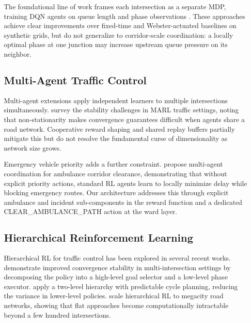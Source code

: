 \documentclass[conference]{IEEEtran}
\begin{document}
The foundational line of work frames each intersection as a separate MDP,
training DQN agents on queue length and phase observations
\cite{acm2021drl, shalaby2021intelligent}. These approaches achieve clear
improvements over fixed-time and Webster-actuated baselines on synthetic
grids, but do not generalize to corridor-scale coordination: a locally
optimal phase at one junction may increase upstream queue pressure on its
neighbor.

\subsection{Multi-Agent Traffic Control}

Multi-agent extensions apply independent learners to multiple intersections
simultaneously. \citeauthor{marl2025sciencedirect} \cite{marl2025sciencedirect}
survey the stability challenges in MARL traffic settings, noting that
non-stationarity makes convergence guarantees difficult when agents share
a road network. Cooperative reward shaping and shared replay buffers partially
mitigate this but do not resolve the fundamental curse of dimensionality
as network size grows.

Emergency vehicle priority adds a further constraint. \citeauthor{multiagent2022emergency}
\cite{multiagent2022emergency} propose multi-agent coordination for ambulance
corridor clearance, demonstrating that without explicit priority actions,
standard RL agents learn to locally minimize delay while blocking emergency
routes. Our architecture addresses this through explicit ambulance and incident
sub-components in the reward function and a dedicated CLEAR\_AMBULANCE\_PATH
action at the ward layer.

\subsection{Hierarchical Reinforcement Learning}

Hierarchical RL for traffic control has been explored in several recent
works. \citeauthor{hier2024naturereports} \cite{hier2024naturereports}
demonstrate improved convergence stability in multi-intersection settings
by decomposing the policy into a high-level goal selector and a low-level
phase executor. \citeauthor{hier2024hierarchical} \cite{hier2024hierarchical}
apply a two-level hierarchy with predictable cycle planning, reducing the
variance in lower-level policies. \citeauthor{hierarchical_megacity} \cite{hierarchical_megacity}
scale hierarchical RL to megacity road networks, showing that flat approaches
become computationally intractable beyond a few hundred intersections.
\end{document}
